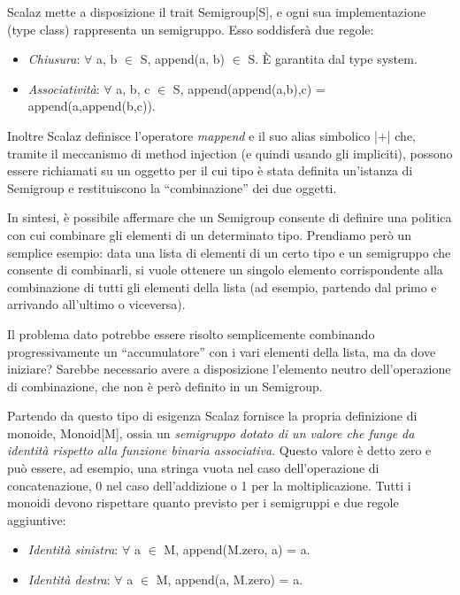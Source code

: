 Scalaz mette a disposizione il trait Semigroup[S], e ogni sua implementazione (type class) rappresenta un semigruppo. Esso soddisferà due regole:

\begin{itemize}
\item \textit{Chiusura}: $\forall$ a, b $\in$ S, append(a, b) $\in$ S. È garantita dal type system.
\item \textit{Associatività}: $\forall$ a, b, c $\in$ S, append(append(a,b),c) = append(a,append(b,c)).
\end{itemize}

Inoltre Scalaz definisce l'operatore \textit{mappend} e il suo alias simbolico |+| che, tramite il meccanismo di method injection (e quindi usando gli impliciti), possono essere richiamati su un oggetto per il cui tipo è stata definita un'istanza di Semigroup e restituiscono la ``combinazione'' dei due oggetti.



In sintesi, è possibile affermare che un Semigroup consente di definire una politica con cui combinare gli elementi di un determinato tipo. Prendiamo però un semplice esempio: data una lista di elementi di un certo tipo e un semigruppo che consente di combinarli, si vuole ottenere un singolo elemento corrispondente alla combinazione di tutti gli elementi della lista (ad esempio, partendo dal primo e arrivando all'ultimo o viceversa).

Il problema dato potrebbe essere risolto semplicemente combinando progressivamente un ``accumulatore'' con i vari elementi della lista, ma da dove iniziare? Sarebbe necessario avere a disposizione l'elemento neutro dell'operazione di combinazione, che non è però definito in un Semigroup.

Partendo da questo tipo di esigenza Scalaz fornisce la propria definizione di monoide, Monoid[M], ossia un \textit{semigruppo dotato di un valore che funge da identità rispetto alla funzione binaria associativa}. Questo valore è detto zero e può essere, ad esempio, una stringa vuota nel caso dell'operazione di concatenazione, 0 nel caso dell'addizione o 1 per la moltiplicazione. Tutti i monoidi devono rispettare quanto previsto per i semigruppi e due regole aggiuntive:

\begin{itemize}
\item \textit{Identità sinistra}: $\forall$ a $\in$ M, append(M.zero, a) = a.
\item \textit{Identità destra}: $\forall$ a $\in$ M, append(a, M.zero) = a.
\end{itemize}

